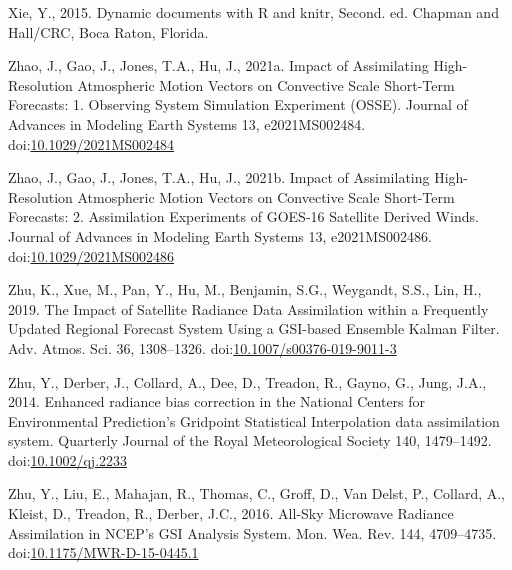 \documentclass[final,5p,times,twocolumn,authoryear]{elsarticle} %
\begin{document}
\leavevmode\hypertarget{ref-xie2015}{}%
Xie, Y., 2015. Dynamic documents with R and knitr, Second. ed. Chapman and Hall/CRC, Boca Raton, Florida.

\leavevmode\hypertarget{ref-zhao2021}{}%
Zhao, J., Gao, J., Jones, T.A., Hu, J., 2021a. Impact of Assimilating High-Resolution Atmospheric Motion Vectors on Convective Scale Short-Term Forecasts: 1. Observing System Simulation Experiment (OSSE). Journal of Advances in Modeling Earth Systems 13, e2021MS002484. doi:\href{https://doi.org/10.1029/2021MS002484}{10.1029/2021MS002484}

\leavevmode\hypertarget{ref-zhao2021a}{}%
Zhao, J., Gao, J., Jones, T.A., Hu, J., 2021b. Impact of Assimilating High-Resolution Atmospheric Motion Vectors on Convective Scale Short-Term Forecasts: 2. Assimilation Experiments of GOES-16 Satellite Derived Winds. Journal of Advances in Modeling Earth Systems 13, e2021MS002486. doi:\href{https://doi.org/10.1029/2021MS002486}{10.1029/2021MS002486}

\leavevmode\hypertarget{ref-zhu2019}{}%
Zhu, K., Xue, M., Pan, Y., Hu, M., Benjamin, S.G., Weygandt, S.S., Lin, H., 2019. The Impact of Satellite Radiance Data Assimilation within a Frequently Updated Regional Forecast System Using a GSI-based Ensemble Kalman Filter. Adv. Atmos. Sci. 36, 1308--1326. doi:\href{https://doi.org/10.1007/s00376-019-9011-3}{10.1007/s00376-019-9011-3}

\leavevmode\hypertarget{ref-zhu2014}{}%
Zhu, Y., Derber, J., Collard, A., Dee, D., Treadon, R., Gayno, G., Jung, J.A., 2014. Enhanced radiance bias correction in the National Centers for Environmental Prediction's Gridpoint Statistical Interpolation data assimilation system. Quarterly Journal of the Royal Meteorological Society 140, 1479--1492. doi:\href{https://doi.org/10.1002/qj.2233}{10.1002/qj.2233}

\leavevmode\hypertarget{ref-zhu2016}{}%
Zhu, Y., Liu, E., Mahajan, R., Thomas, C., Groff, D., Van Delst, P., Collard, A., Kleist, D., Treadon, R., Derber, J.C., 2016. All-Sky Microwave Radiance Assimilation in NCEP's GSI Analysis System. Mon. Wea. Rev. 144, 4709--4735. doi:\href{https://doi.org/10.1175/MWR-D-15-0445.1}{10.1175/MWR-D-15-0445.1}
\end{document}
